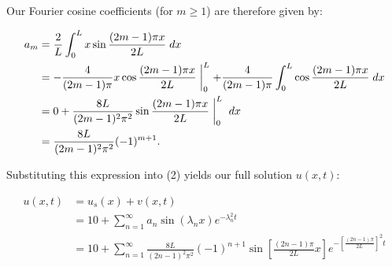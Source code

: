 \begin{solution}
    Our Fourier cosine coefficients (for $m \ge 1$) are therefore given by:

    \begin{alignat*}{2}
        a_m &= \frac{2}{L} \int_{0}^{L}{x \sin{\frac{(2m - 1) \pi x}{2L}} \; dx} \\
            &= -\frac{4}{(2m - 1)\pi} x \cos{\frac{(2m - 1) \pi x}{2L}} \biggm\rvert_{0}^{L} 
               + \frac{4}{(2m - 1)\pi} \int_{0}^{L}{\cos{\frac{(2m - 1) \pi x}{2L}} \; dx}  \\
            &= 0 + \frac{8 L}{(2m - 1)^2 \pi^2} \sin{\frac{(2m - 1) \pi x}{2L} \biggm\rvert_{0}^{L} \; dx}  \\
            &= \frac{8L}{(2m - 1)^2 \pi^2} (-1)^{m+1}.
    \end{alignat*}

    \pagebreak
    Substituting this expression into (2) yields our full solution $u(x, t)$:
    
    \begin{align*}
    u(x, t) &= u_s(x) + v(x, t) \\
            &= 10 + \sum\limits_{n=1}^{\infty}{a_n \sin{\left(\lambda_n x\right)} e^{-\lambda_n^2 t}} \\
            &= 10 + \sum\limits_{n=1}^{\infty}{\frac{8 L}{(2n - 1)^2 \pi^2} (-1)^{n+1} \sin{\left[\frac{(2n - 1) \pi}{2L} x \right]} e^{-\left[ \frac{(2 n - 1) \pi}{2L} \right]^2 t}}
    \end{align*}
    \ \\
\end{solution}